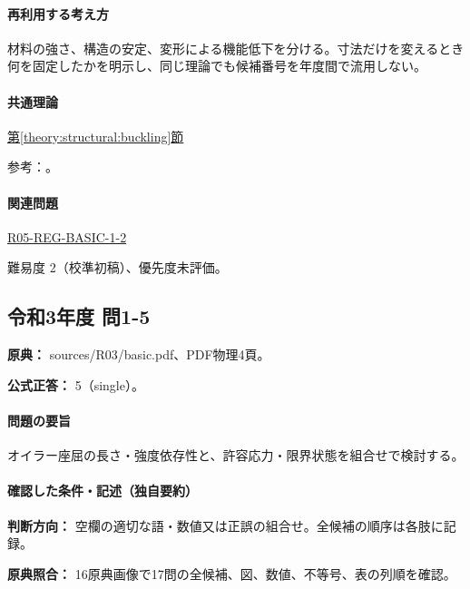 \paragraph{再利用する考え方} 材料の強さ、構造の安定、変形による機能低下を分ける。寸法だけを変えるとき何を固定したかを明示し、同じ理論でも候補番号を年度間で流用しない。

\paragraph{共通理論} \hyperref[theory:structural:buckling]{第\ref*{theory:structural:buckling}節}

\par 参考：\cite{struct_mit_beam,struct_mit_buckling,struct_mlit_limit}。

\paragraph{関連問題} \hyperref[q:r05-reg-basic-1-2]{R05-REG-BASIC-1-2}

\par 難易度 2（校準初稿）、優先度未評価。

\subsection{令和3年度 問1-5}
\label{q:r03-reg-basic-1-5}

\noindent\textbf{原典：} sources/R03/basic.pdf、PDF物理4頁。

\textbf{公式正答：} 5（single）。

\paragraph{問題の要旨} オイラー座屈の長さ・強度依存性と、許容応力・限界状態を組合せで検討する。

\paragraph{確認した条件・記述（独自要約）}\mbox{}\par

\noindent\textbf{判断方向：} 空欄の適切な語・数値又は正誤の組合せ。全候補の順序は各肢に記録。\par

\noindent\textbf{原典照合：} 16原典画像で17問の全候補、図、数値、不等号、表の列順を確認。\par

